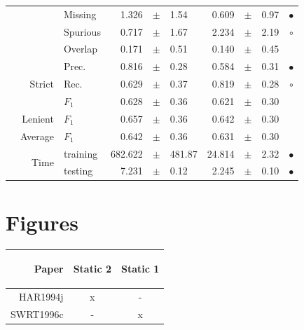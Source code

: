 \begin{longtable}{|r|r|l||rcl|rcl|c|}
\cline{3-10}
  &  &  Missing  & 1.326 &  $\pm$  & 1.54 & 0.609 &  $\pm$  & 0.97 &  $\bullet$\\
\cline{3-10}
  &  &  Spurious  & 0.717 &  $\pm$  & 1.67 & 2.234 &  $\pm$  & 2.19 &  $\circ$\\
\cline{3-10}
  &  &  Overlap  & 0.171 &  $\pm$  & 0.51 & 0.140 &  $\pm$  & 0.45 &  \\
\cline{2-10}
  & \multirow{3}{*}{Strict} &  Prec.  & 0.816 &  $\pm$  & 0.28 & 0.584 &  $\pm$  & 0.31 &  $\bullet$\\
\cline{3-10}
  &  &  Rec.  & 0.629 &  $\pm$  & 0.37 & 0.819 &  $\pm$  & 0.28 &  $\circ$\\
\cline{3-10}
  &  &  $F_1$  & 0.628 &  $\pm$  & 0.36 & 0.621 &  $\pm$  & 0.30 &  \\
\cline{2-10}
  & Lenient &  $F_1$  & 0.657 &  $\pm$  & 0.36 & 0.642 &  $\pm$  & 0.30 &  \\
\cline{2-10}
  & Average &  $F_1$  & 0.642 &  $\pm$  & 0.36 & 0.631 &  $\pm$  & 0.30 &  \\
\cline{2-10}
  & \multirow{2}{*}{Time} &  training  & 682.622 &  $\pm$  & 481.87 & 24.814 &  $\pm$  & 2.32 &  $\bullet$\\
\cline{3-10}
  &  &  testing  & 7.231 &  $\pm$  & 0.12 & 2.245 &  $\pm$  & 0.10 &  $\bullet$\\
\hline
\end{longtable}






\section{Figures}


\begin{tabular}{|r|c|c|}\hline
Paper &\begin{sideways}Static 2\end{sideways} &\begin{sideways}Static 1\end{sideways}\\
\hline
HAR1994j & x & -\\
SWRT1996c & - & x\\
\hline
\end{tabular}




